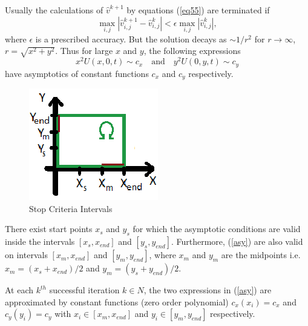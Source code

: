 \documentclass[leqno,11pt]{book}
\newcommand{\rf}[1]{(\ref{#1})}
\begin{document}
Usually  the calculations of  $\widehat{v}^{k+1} $ by equations \rf{eq55} are  terminated if
\begin{equation*}
\max_{i,j} |\widehat{v}^{k+1}_{i,j}-\widehat{v}^{k}_{i,j}| < \epsilon \max_{i,j} |\widehat{v}^{k}_{i,j}| ,
\end{equation*}
where $\epsilon $ is a prescribed accuracy.  But the solution decays as $\sim1/{r}^{2}$ for $r \rightarrow \infty$, $r = \sqrt{{x}^{2} + {y}^{2}}$. Thus for large $x$ and $y$, the following expressions 
\begin{equation}\label{asy}
x^{2}U(x,0,t) \sim c_{x} \quad \textrm{and} \quad   y^{2}U(0,y,t) \sim c_{y}
\end{equation}
have asymptotics of constant functions  $c_{x}$ and $c_{y}$ respectively.
\begin{figure}
     \begin{center}
     \includegraphics[scale=1.2]{StopCrit.eps}
     \end{center}
	\caption{Stop Criteria Intervals}
	\label{fig:StopCritf}
\end{figure}
There exist start points $x_{s}$ and $y_{s}$ for which the asymptotic conditions
are valid inside the intervals $[x_{s}, x_{end}]$ and $[y_{s}, y_{end}]$. Furthermore, (\ref{asy}) are also valid on intervals $[x_{m}, x_{end}]$ and $[y_{m}, y_{end}]$, where $x_{m}$ and $y_{m}$ are the midpoints i.e.
$x_{m} = (x_{s} + x_{end})/2$ and $y_{m} = (y_{s} + y_{end})/2$. 


At each $k^{th}$ successful iteration $k \in N$, the two expressions in \rf{asy} are approximated by constant functions (zero order polynomial) $c_{x}(x_{i}) = c_{x}$ and $c_{y}(y_{i}) = c_{y}$ with $x_{i} \in [x_{m}, x_{end}]$ and $y_{i} \in [y_{m}, y_{end}]$ respectively.
\end{document}
